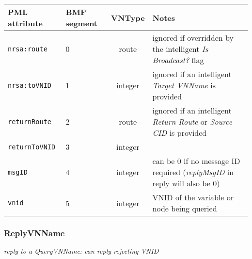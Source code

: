 \documentclass[pdftex,a4paper]{article}
\newcommand{\XMLfont}[1]{{\tt \small #1}}
\begin{document}
\begin{table}[!h]
  \begin{center}
    \label{tab:QueryVNName}
    \begin{tabular}{|l|p{13mm}|c|p{60mm}|}
      \hline

      \textbf{PML attribute} & \textbf{BMF segment} & \textbf{VNType}
      & \textbf{Notes} \\\hline

      \XMLfont{nrsa:route} & 0 & route & ignored if overridden by the
      intelligent {\em Is Broadcast?} flag \\\hline

      \XMLfont{nrsa:toVNID} & 1 & integer & ignored if an intelligent {\em
      Target VNName} is provided \\\hline

      \XMLfont{returnRoute} & 2 & route & ignored if an
      intelligent {\em Return Route} or {\em Source CID} is provided
      \\\hline

      \XMLfont{returnToVNID} & 3 & integer & \\\hline

      \XMLfont{msgID} & 4 & integer & can be 0 if no message ID
      required ({\em replyMsgID} in reply will also be 0) \\\hline

      \XMLfont{vnid} & 5 & integer & VNID of the variable or node
      being queried \\\hline

    \end{tabular}
  \end{center}
\end{table}

\subsubsection{ReplyVNName}

{\em reply to a QueryVNName: can reply rejecting VNID}
\end{document}
